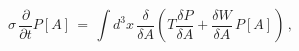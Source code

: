 \begin{equation}
\sigma\,\frac{\partial}{\partial t} P[A] \, = \,
\int \! d^3x \, \frac{\delta}{\delta A} \left( T \frac{\delta P}
{\delta A} + \frac{\delta W}{\delta A}\, P[A] \right) \, ,
\label{eq40}
\end{equation}


